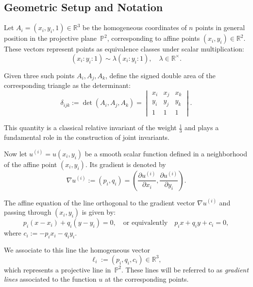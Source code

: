 \documentclass[12pt,reqno]{amsart}
\begin{document}
\subsection{Geometric Setup and Notation}

Let $A_i = (x_i, y_i, 1) \in \mathbb{R}^3$ be the homogeneous coordinates of $n$ points in general position in the projective plane~$\mathbb{P}^2$, corresponding to affine points $(x_i, y_i) \in \mathbb{R}^2$. These vectors represent points as equivalence classes under scalar multiplication:
\[
(x_i : y_i : 1) \sim \lambda (x_i : y_i : 1), \quad \lambda \in \mathbb{R}^\times.
\]

Given three such points $A_i, A_j, A_k$, define the {signed double area} of the corresponding triangle as the determinant:
\[
\delta_{ijk} := \det(A_i, A_j, A_k) =
\begin{vmatrix}
x_i & x_j & x_k \\
y_i & y_j & y_k \\
1   & 1   & 1
\end{vmatrix}.
\]

This quantity is a classical relative invariant of the weight $\frac{1}{3}$  and plays a fundamental role in the construction of joint invariants.




Now let $u^{(i)} = u(x_i, y_i)$ be a smooth scalar function defined in a neighborhood of the affine point $(x_i, y_i)$. Its gradient is denoted by
\[
\nabla u^{(i)} := \left( p_i, q_i \right) = \left( \frac{\partial u^{(i)}}{\partial x_i}, \frac{\partial u^{(i)}}{\partial y_i} \right).
\]

The affine equation of the line orthogonal to the gradient vector $\nabla u^{(i)}$ and passing through $(x_i, y_i)$ is given by:
\[
p_i (x - x_i) + q_i (y - y_i) = 0,
\quad \text{or equivalently} \quad
p_i x + q_i y + c_i = 0,
\]
{where } $c_i := -p_i x_i - q_i y_i.$


We associate to this line the homogeneous vector
\[
\ell_i := (p_i, q_i, c_i)\in \mathbb{R}^3,
\]
which represents a projective line in~$\mathbb{P}^2$. These lines will be referred to as \textit{gradient lines} associated to the function $u$ at the corresponding points.
\end{document}
